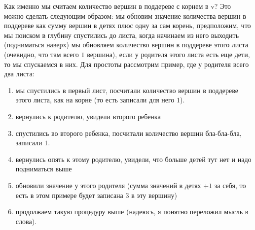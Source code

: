 \begin{upd}
    Как именно мы считаем количество вершин в поддереве с корнем в v? Это можно сделать следующим образом: мы обновим значение количества вершин в поддереве как сумму вершин в детях плюс одну за сам корень, предположим, что мы поиском в глубину спустились до листа, когда начинаем из него выходить (подниматься наверх) мы обновляем количество вершин в поддереве этого листа (очевидно, что там всего $1$ вершина), если у родителя этого листа есть еще дети, то мы спускаемся в них. Для простоты рассмотрим пример, где у родителя всего два листа:
    \begin{enumerate}
        \item мы спустились в первый лист, посчитали количество вершин в поддереве этого листа, как на корне (то есть записали для него $1$).
        \item вернулись к родителю, увидели второго ребенка
        \item спустились во второго ребенка, посчитали количество вершин бла-бла-бла, записали $1$.
        \item вернулись опять к этому родителю, увидели, что больше детей тут нет и надо подниматься выше
        \item обновили значение у этого родителя (сумма значений в детях $+1$ за себя, то есть в этом примере будет записана $3$ в эту вершину)
        \item продолжаем такую процедуру выше (надеюсь, я понятно переложил мысль в слова).
    \end{enumerate}
\end{upd}